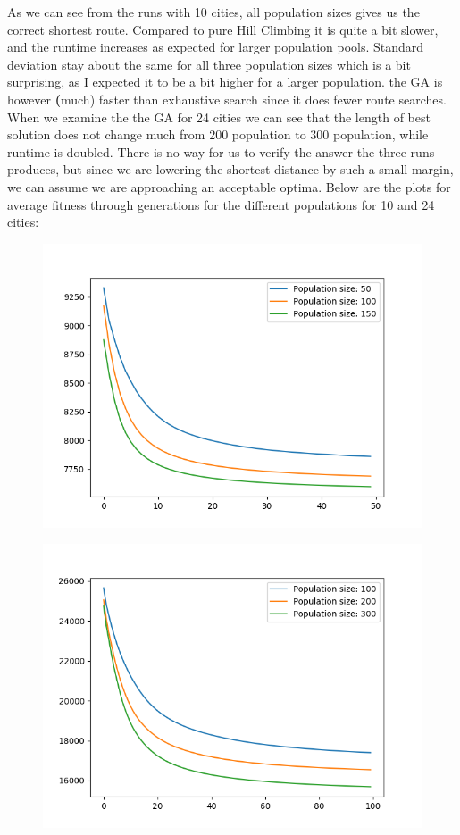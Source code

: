\documentclass[a4paper, norsk, 12pt]{article}
\begin{document}
As we can see from the runs with 10 cities, all population sizes gives us the correct shortest route. Compared to pure Hill Climbing it is quite a bit slower, and the runtime increases as expected for larger population pools. Standard deviation stay about the same for all three population sizes which is a bit surprising, as I expected it to be a bit higher for a larger population. the GA is however \textbf(much) faster than exhaustive search since it does fewer route searches.\newline\newline\newline\newline
When we examine the the GA for 24 cities we can see that the length of best solution does not change much from 200 population to 300 population, while runtime is doubled. There is no way for us to verify the answer the three runs produces, but since we are lowering the shortest distance by such a small margin, we can assume we are approaching an acceptable optima. Below are the plots for average fitness through generations for the different populations for 10 and 24 cities:
	\begin{figure}[h!]
	\centering
	\includegraphics[width=1.0\textwidth]{ga_plt_10.png}
	\end{figure}
\newpage
	\begin{figure}[t!]
	\centering
	\includegraphics[width=1.0\textwidth]{ga_plt_24.png}
	\end{figure}
\end{document}
